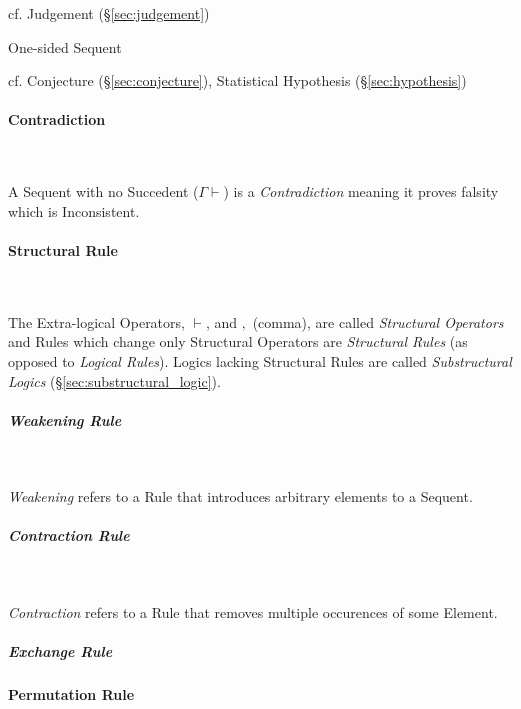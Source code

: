 cf. Judgement (\S\ref{sec:judgement})

One-sided Sequent

\fist cf. Conjecture (\S\ref{sec:conjecture}), Statistical Hypothesis
(\S\ref{sec:hypothesis})



\paragraph{Contradiction}\label{sec:contradiction} \hfill \\\hfill

A Sequent with no Succedent ($\Gamma \vdash$) is a
\emph{Contradiction} meaning it proves falsity which is
Inconsistent.



\paragraph{Structural Rule}\label{sec:structural_rule} \hfill \\\hfill

The Extra-logical Operators, $\vdash$, and $,$ (comma), are called
\emph{Structural Operators} and Rules which change only Structural
Operators are \emph{Structural Rules} (as opposed to \emph{Logical
  Rules}). Logics lacking Structural Rules are called
\emph{Substructural Logics} (\S\ref{sec:substructural_logic}).



\subparagraph{Weakening Rule}\label{sec:weakening_rule} \hfill \\\hfill

\emph{Weakening} refers to a Rule that introduces arbitrary elements
to a Sequent.



\subparagraph{Contraction Rule}\label{sec:contraction_rule} \hfill \\\hfill

\emph{Contraction} refers to a Rule that removes
multiple occurences of some Element.



\subparagraph{Exchange Rule}\label{sec:exchange_rule}\hfill



\paragraph{Permutation Rule}\label{sec:permutation_rule} \hfill \\\hfill

